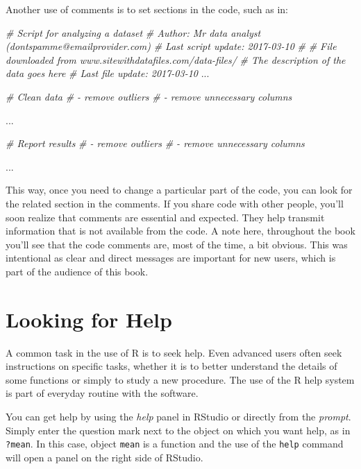 \documentclass[11pt,]{book}
\newenvironment{Shaded}{\begin{snugshade}}{\end{snugshade}}
\newcommand{\CommentTok}[1]{\textcolor[rgb]{0.56,0.35,0.01}{\textit{#1}}}
\newcommand{\NormalTok}[1]{#1}
\begin{document}
Another use of comments is to set sections in the code, such as in:

\begin{Shaded}
\begin{Highlighting}[]
\CommentTok{# Script for analyzing a dataset}
\CommentTok{# Author: Mr data analyst (dontspamme@emailprovider.com)}
\CommentTok{# Last script update: 2017-03-10}
\CommentTok{#}
\CommentTok{# File downloaded from www.sitewithdatafiles.com/data-files/}
\CommentTok{# The description of the data goes here}
\CommentTok{# Last file update: 2017-03-10}
\NormalTok{...}

\CommentTok{# Clean data}
\CommentTok{# - remove outliers}
\CommentTok{# - remove unnecessary columns}

\NormalTok{...}

\CommentTok{# Report results}
\CommentTok{# - remove outliers}
\CommentTok{# - remove unnecessary columns}

\NormalTok{...}
\end{Highlighting}
\end{Shaded}

This way, once you need to change a particular part of the code, you can
look for the related section in the comments. If you share code with
other people, you'll soon realize that comments are essential and
expected. They help transmit information that is not available from the
code. A note here, throughout the book you'll see that the code comments
are, most of the time, a bit obvious. This was intentional as clear and
direct messages are important for new users, which is part of the
audience of this book.

\section{Looking for Help}\label{looking-for-help}

A common task in the use of R is to seek help. Even advanced users often
seek instructions on specific tasks, whether it is to better understand
the details of some functions or simply to study a new procedure. The
use of the R help system is part of everyday routine with the software.

You can get help by using the \emph{help} panel in RStudio or directly
from the \emph{prompt}. Simply enter the question mark next to the
object on which you want help, as in \texttt{?mean}. In this case,
object \texttt{mean} is a function and the use of the \texttt{help}
command will open a panel on the right side of RStudio.
\end{document}
